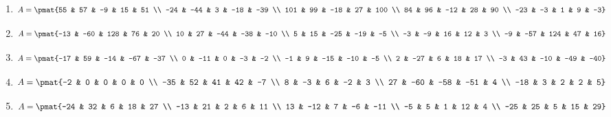 \begin{enumerate}
\item

\begin{align*}
A = \pmat{55 & 57 & -9 & 15 & 51 \\ -24 & -44 & 3 & -18 & -39 \\ 101 & 99 & -18 & 27 & 100 \\ 84 & 96 & -12 & 28 & 90 \\ -23 & -3 & 1 & 9 & -3}
\end{align*}

\item

\begin{align*}
A = \pmat{-13 & -60 & 128 & 76 & 20 \\ 10 & 27 & -44 & -38 & -10 \\ 5 & 15 & -25 & -19 & -5 \\ -3 & -9 & 16 & 12 & 3 \\ -9 & -57 & 124 & 47 & 16}
\end{align*}

\item

\begin{align*}
A = \pmat{-17 & 59 & -14 & -67 & -37 \\ 0 & -11 & 0 & -3 & -2 \\ -1 & 9 & -15 & -10 & -5 \\ 2 & -27 & 6 & 18 & 17 \\ -3 & 43 & -10 & -49 & -40}
\end{align*}

\item

\begin{align*}
A = \pmat{-2 & 0 & 0 & 0 & 0 \\ -35 & 52 & 41 & 42 & -7 \\ 8 & -3 & 6 & -2 & 3 \\ 27 & -60 & -58 & -51 & 4 \\ -18 & 3 & 2 & 2 & 5}
\end{align*}

\item

\begin{align*}
A = \pmat{-24 & 32 & 6 & 18 & 27 \\ -13 & 21 & 2 & 6 & 11 \\ 13 & -12 & 7 & -6 & -11 \\ -5 & 5 & 1 & 12 & 4 \\ -25 & 25 & 5 & 15 & 29}
\end{align*}


\end{enumerate}
